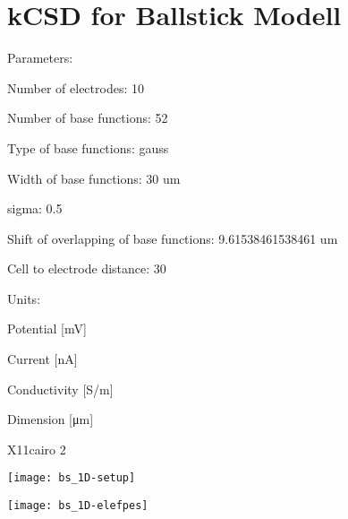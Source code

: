 \documentclass[10pt,a4paper]{report}
\author{Dorottya Cserpan}
\begin{document}
\section{kCSD for Ballstick Modell}




Parameters:

\begin{Schunk}
\begin{Soutput}
Number of electrodes: 10
\end{Soutput}
\begin{Soutput}
Number of base functions: 52
\end{Soutput}
\begin{Soutput}
Type of base functions: gauss
\end{Soutput}
\begin{Soutput}
Width of base functions: 30 um
\end{Soutput}
\begin{Soutput}
sigma: 0.5
\end{Soutput}
\begin{Soutput}
Shift of overlapping of base functions: 9.61538461538461 um
\end{Soutput}
\begin{Soutput}
Cell to electrode distance: 30
\end{Soutput}
\end{Schunk}

Units:
\begin{Schunk}
\begin{Soutput}
Potential 	  [mV]
\end{Soutput}
\begin{Soutput}
Current      [nA]
\end{Soutput}
\begin{Soutput}
Conductivity [S/m]
\end{Soutput}
\begin{Soutput}
Dimension 	  [μm]
\end{Soutput}
\end{Schunk}




\begin{Schunk}
\begin{Soutput}
X11cairo 
       2 
\end{Soutput}
\end{Schunk}
\texttt{[image: bs\_1D-setup]}

\texttt{[image: bs\_1D-elefpes]}
\end{document}
